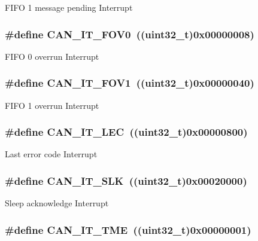 \label{group__CAN__interrupts_gaa0e101053fb203629e0e9a954213e71e}
FIFO 1 message pending Interrupt \hypertarget{group__CAN__interrupts_ga066a4317f95669e5b5931c9a759cf248}{
\subsubsection[{CAN\_\-IT\_\-FOV0}]{\setlength{\rightskip}{0pt plus 5cm}\#define CAN\_\-IT\_\-FOV0~((uint32\_\-t)0x00000008)}}
\label{group__CAN__interrupts_ga066a4317f95669e5b5931c9a759cf248}
FIFO 0 overrun Interrupt \hypertarget{group__CAN__interrupts_ga963301fdbede5f9a9665dc5b6210eaec}{
\subsubsection[{CAN\_\-IT\_\-FOV1}]{\setlength{\rightskip}{0pt plus 5cm}\#define CAN\_\-IT\_\-FOV1~((uint32\_\-t)0x00000040)}}
\label{group__CAN__interrupts_ga963301fdbede5f9a9665dc5b6210eaec}
FIFO 1 overrun Interrupt \hypertarget{group__CAN__interrupts_gad670b6f001bf67f24e17d91ada50a61c}{
\subsubsection[{CAN\_\-IT\_\-LEC}]{\setlength{\rightskip}{0pt plus 5cm}\#define CAN\_\-IT\_\-LEC~((uint32\_\-t)0x00000800)}}
\label{group__CAN__interrupts_gad670b6f001bf67f24e17d91ada50a61c}
Last error code Interrupt \hypertarget{group__CAN__interrupts_ga639d4ab2777d9a2f8b7e67071b091059}{
\subsubsection[{CAN\_\-IT\_\-SLK}]{\setlength{\rightskip}{0pt plus 5cm}\#define CAN\_\-IT\_\-SLK~((uint32\_\-t)0x00020000)}}
\label{group__CAN__interrupts_ga639d4ab2777d9a2f8b7e67071b091059}
Sleep acknowledge Interrupt \hypertarget{group__CAN__interrupts_ga619e36230fa2eb089a7c1936b5004eb9}{
\subsubsection[{CAN\_\-IT\_\-TME}]{\setlength{\rightskip}{0pt plus 5cm}\#define CAN\_\-IT\_\-TME~((uint32\_\-t)0x00000001)}}
